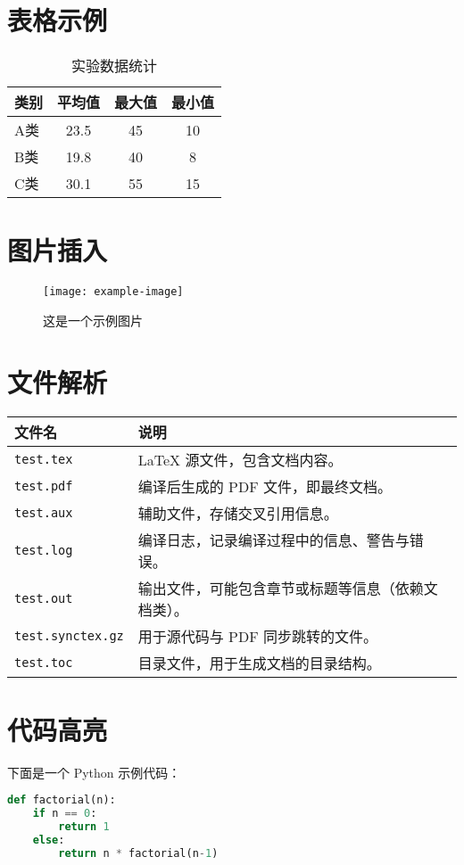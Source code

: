 \documentclass[12pt]{article}
\begin{document}
\section{表格示例}
\begin{table}[h]
    \centering
    \caption{实验数据统计}
    \begin{tabular}{lccc}
        \toprule
        类别 & 平均值 & 最大值 & 最小值 \\
        \midrule
        A类 & 23.5 & 45 & 10 \\
        B类 & 19.8 & 40 & 8 \\
        C类 & 30.1 & 55 & 15 \\
        \bottomrule
    \end{tabular}
\end{table}

\section{图片插入}
\begin{figure}[h]
    \centering
    \texttt{[image: example-image]}
    \caption{这是一个示例图片}
\end{figure}

\section{文件解析}
\begin{longtable}{@{}ll@{}}
    \toprule
    \textbf{文件名} & \textbf{说明} \\
    \midrule
    \texttt{test.tex} & LaTeX 源文件，包含文档内容。 \\
    \texttt{test.pdf} & 编译后生成的 PDF 文件，即最终文档。 \\
    \texttt{test.aux} & 辅助文件，存储交叉引用信息。 \\
    \texttt{test.log} & 编译日志，记录编译过程中的信息、警告与错误。 \\
    \texttt{test.out} & 输出文件，可能包含章节或标题等信息（依赖文档类）。 \\
    \texttt{test.synctex.gz} & 用于源代码与 PDF 同步跳转的文件。 \\
    \texttt{test.toc} & 目录文件，用于生成文档的目录结构。 \\
    \bottomrule
\end{longtable}

\section{代码高亮}
下面是一个 Python 示例代码：
\begin{lstlisting}[language=Python]
def factorial(n):
    if n == 0:
        return 1
    else:
        return n * factorial(n-1)
\end{lstlisting}
\end{document}
